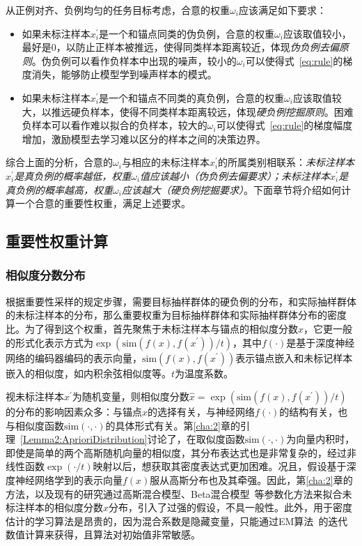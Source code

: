 从正例对齐、负例均匀的任务目标考虑，合意的权重$\omega_i$应该满足如下要求：
\begin{itemize}
\item 如果未标注样本$x_i^\prime$是一个和锚点同类的伪负例，合意的权重$\omega_i$应该取值较小，最好是0，以防止正样本被推远，使得同类样本距离较近，体现\textit{伪负例去偏原则}。伪负例可以看作负样本中出现的噪声，较小的$\omega_i$可以使得式~\eqref{eq:rule}的梯度消失，能够防止模型学到噪声样本的模式。
\item 如果未标注样本$x_i^\prime$是一个和锚点不同类的真负例，合意的权重$\omega_i$应该取值较大，以推远硬负样本，使得不同类样本距离较远，体现\textit{硬负例挖掘原则}。困难负样本可以看作难以拟合的负样本，较大的$\omega_i$可以使得式~\eqref{eq:rule}的梯度幅度增加，激励模型去学习难以区分的样本之间的决策边界。
\end{itemize}

综合上面的分析，合意的$\omega_i$与相应的未标注样本$x^\prime_i$的所属类别相联系：\textit{未标注样本$x^\prime_i$是真负例的概率越低，权重$\omega_i$值应该越小（伪负例去偏要求）；未标注样本$x^\prime_i$是真负例的概率越高，权重$\omega_i$应该越大（硬负例挖掘要求）}。下面章节将介绍如何计算一个合意的重要性权重，满足上述要求。

\subsection{重要性权重计算}
\subsubsection{相似度分数分布}
根据重要性采样的规定步骤，需要目标抽样群体的硬负例的分布，和实际抽样群体的未标注样本的分布，那么重要权重为目标抽样群体和实际抽样群体分布的密度比。为了得到这个权重，首先聚焦于未标注样本与锚点的相似度分数$\hat{x}$，它更一般的形式化表示方式为$\exp(\text{sim}(f(x),f(x^\prime))/t)$，其中$f(\cdot)$是基于深度神经网络的编码器编码的表示向量，$\text{sim}(f(x),f(x^\prime))$表示锚点嵌入和未标记样本嵌入的相似度，如内积余弦相似度等。$t$为温度系数。

视未标注样本$x^\prime$为随机变量，则相似度分数$\hat{x} = \exp(\text{sim}(f(x),f(x^\prime))/t)$的分布的影响因素众多：与锚点$x$的选择有关，与神经网络$f(\cdot)$的结构有关，也与相似度函数$\text{sim}(\cdot,\cdot)$的具体形式有关。第\ref{cha:2}章的引理~\ref{Lemma2:AprioriDistribution}讨论了，在取似度函数$\text{sim}(\cdot,\cdot)$为向量内积时，即使是简单的两个高斯随机向量的相似度，其分布表达式也是非常复杂的，经过非线性函数$\exp(\cdot/t)$映射以后，想获取其密度表达式更加困难。况且，假设基于深度神经网络学到的表示向量$f(x)$服从高斯分布也及其牵强。因此，第\ref{cha:2}章的方法，以及现有的研究\cite{Xia:2022:ICML}通过高斯混合模型\cite{Lindsay:1995}、Beta混合模型~\cite{Xia:2022:ICML}等参数化方法来拟合未标注样本的相似度分数$\hat{x}$分布，引入了过强的假设，不具一般性。此外，用于密度估计的学习算法是昂贵的，因为混合系数是隐藏变量，只能通过EM算法~\cite{Dempster:1977:RSS}的迭代数值计算来获得，且算法对初始值非常敏感。

